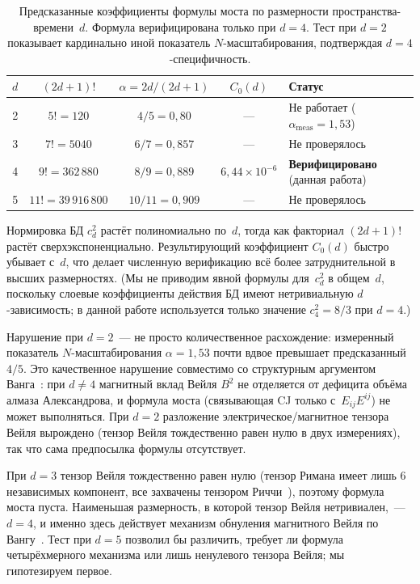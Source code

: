 \documentclass[12pt,a4paper]{article}
\theoremstyle{plain}
\theoremstyle{definition}
\theoremstyle{remark}
\newcommand{\Esq}{E_{ij}E^{ij}}
\begin{document}
\begin{table}[ht]
\centering
\caption{Предсказанные коэффициенты формулы моста по
размерности пространства-времени~$d$.  Формула верифицирована
только при $d = 4$.  Тест при $d = 2$ показывает кардинально
иной показатель $N$-масштабирования, подтверждая
$d = 4$-специфичность.}
\label{tab:dimension}
\begin{tabular}{ccccl}
\toprule
$d$ & $(2d+1)!$ & $\alpha = 2d/(2d+1)$
    & $C_0(d)$ & Статус \\
\midrule
2 & $5! = 120$ & $4/5 = 0{,}80$
    & --- & Не работает ($\alpha_{\mathrm{meas}} = 1{,}53$) \\
3 & $7! = 5040$ & $6/7 = 0{,}857$
    & --- & Не проверялось \\
4 & $9! = 362\,880$ & $8/9 = 0{,}889$
    & $6{,}44 \times 10^{-6}$ & \textbf{Верифицировано} (данная работа) \\
5 & $11! = 39\,916\,800$ & $10/11 = 0{,}909$
    & --- & Не проверялось \\
\bottomrule
\end{tabular}
\end{table}

Нормировка БД $c_d^2$ растёт полиномиально по~$d$, тогда
как факториал $(2d+1)!$ растёт сверхэкспоненциально.
Результирующий коэффициент $C_0(d)$ быстро убывает с~$d$,
что делает численную верификацию всё более затруднительной
в высших размерностях.  (Мы не приводим явной формулы
для~$c_d^2$ в общем~$d$, поскольку слоевые коэффициенты
действия БД имеют нетривиальную $d$-зависимость; в данной
работе используется только значение $c_4^2 = 8/3$ при
$d = 4$.)

Нарушение при $d = 2$~--- не просто количественное
расхождение: измеренный показатель $N$-масштабирования
$\alpha = 1{,}53$ почти вдвое превышает предсказанный $4/5$.
Это качественное нарушение совместимо со структурным
аргументом Ванга~\cite{Wang:2019}: при $d \neq 4$ магнитный
вклад Вейля $B^2$ не отделяется от дефицита объёма алмаза
Александрова, и формула моста (связывающая CJ только
с~$\Esq$) не может выполняться.  При $d = 2$ разложение
электрическое/магнитное тензора Вейля вырождено (тензор
Вейля тождественно равен нулю в двух измерениях), так что
сама предпосылка формулы отсутствует.

При $d = 3$ тензор Вейля тождественно равен нулю (тензор
Римана имеет лишь 6 независимых компонент, все захвачены
тензором Риччи~\cite{Wald:1984}), поэтому формула моста
пуста.  Наименьшая размерность, в которой тензор Вейля
нетривиален,~--- $d = 4$, и именно здесь действует механизм
обнуления магнитного Вейля по Вангу~\cite{Wang:2019}.  Тест
при $d = 5$ позволил бы различить, требует ли формула
четырёхмерного механизма или лишь ненулевого тензора Вейля;
мы гипотезируем первое.
\end{document}
